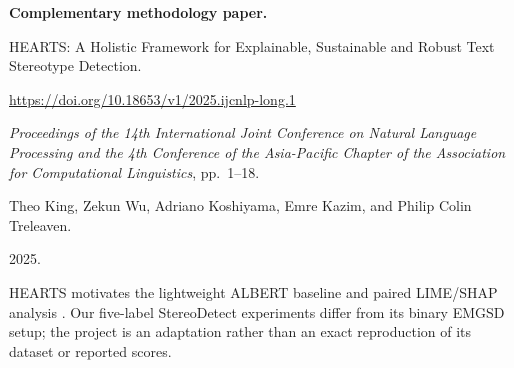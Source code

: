 \documentclass[11pt,letterpaper]{article}
\begin{document}
\textbf{Complementary methodology paper.}
\begin{description}[style=nextline,leftmargin=0pt]
\item[Title:] HEARTS: A Holistic Framework for Explainable, Sustainable and Robust Text Stereotype Detection.
\item[DOI:] \url{https://doi.org/10.18653/v1/2025.ijcnlp-long.1}
\item[Conference / publication:] \textit{Proceedings of the 14th International Joint Conference on Natural Language Processing and the 4th Conference of the Asia-Pacific Chapter of the Association for Computational Linguistics}, pp.\ 1--18.
\item[Authors:] Theo King, Zekun Wu, Adriano Koshiyama, Emre Kazim, and Philip Colin Treleaven.
\item[Year:] 2025.
\end{description}
HEARTS motivates the lightweight ALBERT baseline and paired LIME/SHAP analysis \citep{king2025}. Our five-label StereoDetect experiments differ from its binary EMGSD setup; the project is an adaptation rather than an exact reproduction of its dataset or reported scores.

\clearpage
{}





\clearpage
\renewcommand{\refname}{References}

\end{document}
